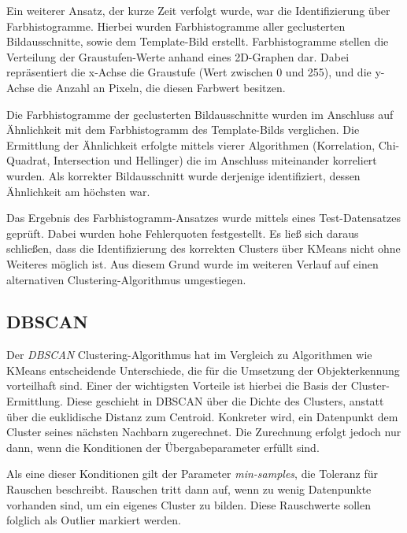 \documentclass[
    type=Projektarbeit,
    status=draft, %
    language=german, %
    bibengine=bibtex,
]{unibwm-inf-thesis}
\begin{document}
    Ein weiterer Ansatz, der kurze Zeit verfolgt wurde, war die Identifizierung über Farbhistogramme.
    Hierbei wurden Farbhistogramme aller geclusterten Bildausschnitte, sowie dem Template-Bild erstellt.
    Farbhistogramme stellen die Verteilung der Graustufen-Werte anhand eines 2D-Graphen dar.
    Dabei repräsentiert die x-Achse die Graustufe (Wert zwischen 0 und 255), und die y-Achse die Anzahl an Pixeln, die diesen Farbwert besitzen.

    Die Farbhistogramme der geclusterten Bildausschnitte wurden im Anschluss auf Ähnlichkeit mit dem Farbhistogramm des Template-Bilds verglichen.
    Die Ermittlung der Ähnlichkeit erfolgte mittels vierer Algorithmen (Korrelation, Chi-Quadrat, Intersection und Hellinger) die im Anschluss miteinander korreliert wurden.
    Als korrekter Bildausschnitt wurde derjenige identifiziert, dessen Ähnlichkeit am höchsten war.

    Das Ergebnis des Farbhistogramm-Ansatzes wurde mittels eines Test-Datensatzes geprüft.
    Dabei wurden hohe Fehlerquoten festgestellt.
    Es ließ sich daraus schließen, dass die Identifizierung des korrekten Clusters über KMeans nicht ohne Weiteres möglich ist.
    Aus diesem Grund wurde im weiteren Verlauf auf einen alternativen Clustering-Algorithmus umgestiegen.

    \subsection{DBSCAN}\label{subsec:dbscan}
    Der \textit{DBSCAN} Clustering-Algorithmus hat im Vergleich zu Algorithmen wie KMeans entscheidende Unterschiede, die für die Umsetzung der Objekterkennung vorteilhaft sind.
    Einer der wichtigsten Vorteile ist hierbei die Basis der Cluster-Ermittlung.
    Diese geschieht in DBSCAN über die Dichte des Clusters, anstatt über die euklidische Distanz zum Centroid.
    Konkreter wird, ein Datenpunkt dem Cluster seines nächsten Nachbarn zugerechnet.
    Die Zurechnung erfolgt jedoch nur dann, wenn die Konditionen der Übergabeparameter erfüllt sind.

    Als eine dieser Konditionen gilt der Parameter \textit{min-samples}, die Toleranz für Rauschen beschreibt.
    Rauschen tritt dann auf, wenn zu wenig Datenpunkte vorhanden sind, um ein eigenes Cluster zu bilden.
    Diese Rauschwerte sollen folglich als Outlier markiert werden.
\end{document}
